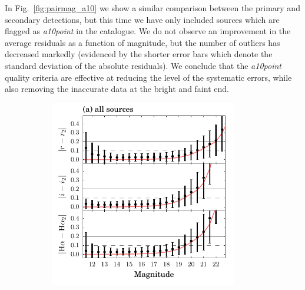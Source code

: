 \documentclass[a4paper,useAMS,usenatbib]{mn2e}
\begin{document}
In Fig.~\ref{fig:pairmag_a10} we show 
a similar comparison between the primary and secondary detections,
but this time we have only included sources which are flagged
as \emph{a10point} in the catalogue.
We do not observe an improvement in the average residuals as a function of magnitude,
but the number of outliers has decreased markedly
(evidenced by the shorter error bars which denote the standard deviation of the absolute residuals).
We conclude that the \emph{a10point} quality criteria are effective
at reducing the level of the systematic errors,
while also removing the inaccurate data at the bright and faint end.

\begin{figure}
\captionsetup[subfigure]{labelformat=empty}
\begin{subfigure}[b]{\linewidth}
\centering
\includegraphics[width=0.9\textwidth]{figures/repeatability/repeatability.pdf}
\caption{}
\label{fig:pairmag}
\end{subfigure}
\hspace{0.5cm}
\begin{subfigure}[b]{\linewidth}
\centering

\end{subfigure}
\end{figure}
\end{document}
